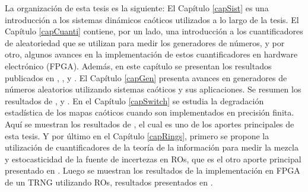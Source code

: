 La organización de esta tesis es la siguiente:
El Capítulo \ref{capSist} es una introducción a los sistemas dinámicos caóticos utilizados a lo largo de la tesis.
El Capítulo \ref{capCuanti} contiene, por un lado, una introducción a los cuantificadores de aleatoriedad que se utilizan para medir los generadores de números, y por otro, algunos avances en la implementación de estos cuantificadores en hardware electrónico (FPGA). Además, en este capítulo se presentan los resultados publicados en \cite{CASE2013}, \cite{DeMicco2013}, \cite{CASE2013} y \cite{LASCAS2017}.
El Capítulo \ref{capGen} presenta avances en generadores de números aleatorios utilizando sistemas caóticos y sus aplicaciones. Se resumen los resultados de \cite{Antonelli2012}, \cite{CAMTA2012} y \cite{DeMicco2017}.
En el Capítulo \ref{capSwitch} se estudia la degradación estadística de los mapas caóticos cuando son implementados en precisión finita. Aquí se muestran los resultados de \cite{Antonelli2018}, el cual es uno de los aportes principales de esta tesis.
Y por último en el Capítulo \ref{capRings}, primero se propone la utilización de cuantificadores de la teoría de la información para medir la mezcla y estocasticidad de la fuente de incertezas en ROs, que es el otro aporte principal presentado en \cite{Antonelli2017}.
Luego se muestran los resultados de la implementación en FPGA de un TRNG utilizando ROs, resultados presentados en \cite{SPL2014}.